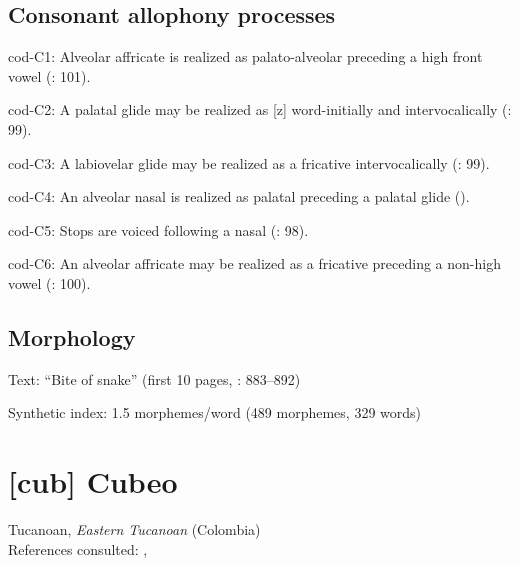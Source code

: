 {\subsection*{Consonant allophony processes}
\begin{appendixdesc}

\item[cod-C1:] Alveolar affricate is realized as palato-alveolar preceding a high front vowel (\citealt{VallejosYopán2010}: 101).

\item[cod-C2:] A palatal glide may be realized as [z] word-initially and intervocalically (\citealt{VallejosYopán2010}: 99).

\item[cod-C3:] A labiovelar glide may be realized as a fricative intervocalically (\citealt{VallejosYopán2010}: 99).

\item[cod-C4:] An alveolar nasal is realized as palatal preceding a palatal glide (\citealt{VallejosYopán2010}).

\item[cod-C5:] Stops are voiced following a nasal (\citealt{VallejosYopán2010}: 98).

\item[cod-C6:] An alveolar affricate may be realized as a fricative preceding a non-high vowel (\citealt{VallejosYopán2010}: 100).
\end{appendixdesc}
\subsection*{Morphology}

\begin{appendixdesc}

\item[Text:] “Bite of snake” (first 10 pages, \citealt{VallejosYopán2010}: 883--892)

\item[Synthetic index:] 1.5 morphemes/word (489 morphemes, 329 words)
\end{appendixdesc}
\section*{[cub] Cubeo}  %
Tucanoan, \textit{Eastern Tucanoan} (Colombia)\medskip\\
References consulted: \citet{Chacon2012}, \citet{MorseMaxwell1999}

}
